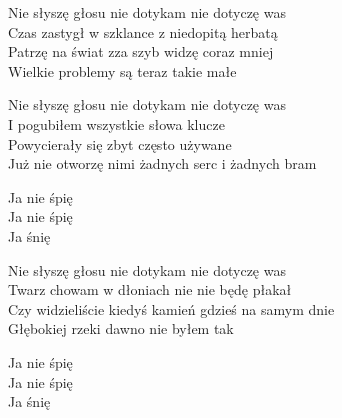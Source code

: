 \begin{text}
    Nie słyszę głosu nie dotykam nie dotyczę was\\
    Czas zastygł w szklance z niedopitą herbatą\\
    Patrzę na świat zza szyb widzę coraz mniej\\
    Wielkie problemy są teraz takie małe

    Nie słyszę głosu nie dotykam nie dotyczę was\\
    I pogubiłem wszystkie słowa klucze\\
    Powycierały się zbyt często używane\\
    Już nie otworzę nimi żadnych serc i żadnych bram

    Ja nie śpię\\
    Ja nie śpię\\
    Ja śnię

    Nie słyszę głosu nie dotykam nie dotyczę was\\
    Twarz chowam w dłoniach nie nie będę płakał\\
    Czy widzieliście kiedyś kamień gdzieś na samym dnie\\
    Głębokiej rzeki dawno nie byłem tak

    Ja nie śpię\\
    Ja nie śpię\\
    Ja śnię
\end{text}
\begin{chord}

\end{chord}